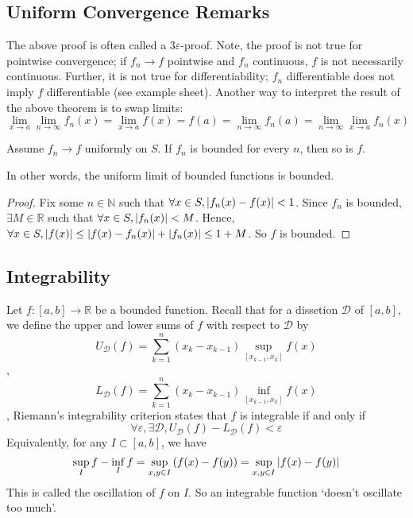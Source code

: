 \subsection{Uniform Convergence Remarks}
The above proof is often called a \( 3\varepsilon \)-proof.
Note, the proof is not true for pointwise convergence; if \( f_n \to f \) pointwise and \( f_n \) continuous, \( f \) is not necessarily continuous.
Further, it is not true for differentiability; \( f_n \) differentiable does not imply \( f \) differentiable (see example sheet).
Another way to interpret the result of the above theorem is to swap limits:
\[
	\lim_{x \to a} \lim_{n \to \infty} f_n(x) = \lim_{x \to a} f(x) = f(a) = \lim_{n \to \infty} f_n(a) = \lim_{n \to \infty} \lim_{x \to a} f_n(x)
\]

\begin{lemma}
	Assume \( f_n \to f \) uniformly on \( S \).
	If \( f_n \) is bounded for every \( n \), then so is \( f \).
\end{lemma}
\noindent In other words, the uniform limit of bounded functions is bounded.
\begin{proof}
	Fix some \( n \in \mathbb N \) such that \( \forall x \in S, \abs{f_n(x) - f(x)} < 1 \).
	Since \( f_n \) is bounded, \( \exists M \in \mathbb R \) such that \( \forall x \in S, \abs{f_n(x)} < M \).
	Hence, \( \forall x \in S, \abs{f(x)} \leq \abs{f(x) - f_n(x)} + \abs{f_n(x)} \leq 1 + M \).
	So \( f \) is bounded.
\end{proof}

\subsection{Integrability}
Let \( f \colon [a, b] \to \mathbb R \) be a bounded function.
Recall that for a dissetion \( \mathcal D \) of \( [a, b] \), we define the upper and lower sums of \( f \) with respect to \( \mathcal D \) by
\[
	U_{\mathcal D}(f) = \sum_{k=1}^n (x_k - x_{k-1}) \sup_{[x_{k-1}, x_k]} f(x)
\],
\[
	L_{\mathcal D}(f) = \sum_{k=1}^n (x_k - x_{k-1}) \inf_{[x_{k-1}, x_k]} f(x)
\],
Riemann's integrability criterion states that \( f \) is integrable if and only if
\[
	\forall \varepsilon, \exists \mathcal D, U_{\mathcal D}(f) - L_{\mathcal D}(f) < \varepsilon
\]
Equivalently, %
for any \( I \subset [a, b] \), we have
\[
	\sup_I f - \inf_I f = \sup_{x,y \in I} \qty(f(x) - f(y)) = \sup_{x,y \in I} \abs{f(x) - f(y)}
\]
This is called the oscillation of \( f \) on \( I \).
So an integrable function `doesn't oscillate too much'.


